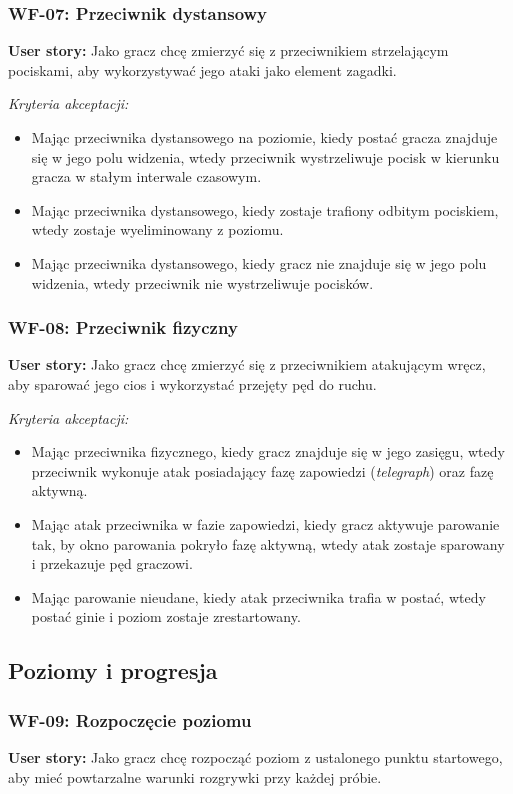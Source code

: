 \subsubsection*{WF-07: Przeciwnik dystansowy}
\textbf{User story:} Jako gracz chcę zmierzyć się z przeciwnikiem strzelającym pociskami, aby wykorzystywać jego ataki jako element zagadki.

\textit{Kryteria akceptacji:}
\begin{itemize}[noitemsep]
    \item Mając przeciwnika dystansowego na poziomie, kiedy postać gracza znajduje się w jego polu widzenia, wtedy przeciwnik wystrzeliwuje pocisk w kierunku gracza w stałym interwale czasowym.
    \item Mając przeciwnika dystansowego, kiedy zostaje trafiony odbitym pociskiem, wtedy zostaje wyeliminowany z poziomu.
    \item Mając przeciwnika dystansowego, kiedy gracz nie znajduje się w jego polu widzenia, wtedy przeciwnik nie wystrzeliwuje pocisków.
\end{itemize}

\subsubsection*{WF-08: Przeciwnik fizyczny}
\textbf{User story:} Jako gracz chcę zmierzyć się z przeciwnikiem atakującym wręcz, aby sparować jego cios i wykorzystać przejęty pęd do ruchu.

\textit{Kryteria akceptacji:}
\begin{itemize}[noitemsep]
    \item Mając przeciwnika fizycznego, kiedy gracz znajduje się w jego zasięgu, wtedy przeciwnik wykonuje atak posiadający fazę zapowiedzi (\textit{telegraph}) oraz fazę aktywną.
    \item Mając atak przeciwnika w fazie zapowiedzi, kiedy gracz aktywuje parowanie tak, by okno parowania pokryło fazę aktywną, wtedy atak zostaje sparowany i przekazuje pęd graczowi.
    \item Mając parowanie nieudane, kiedy atak przeciwnika trafia w postać, wtedy postać ginie i poziom zostaje zrestartowany.
\end{itemize}

\subsection{Poziomy i progresja}

\subsubsection*{WF-09: Rozpoczęcie poziomu}
\textbf{User story:} Jako gracz chcę rozpocząć poziom z ustalonego punktu startowego, aby mieć powtarzalne warunki rozgrywki przy każdej próbie.

